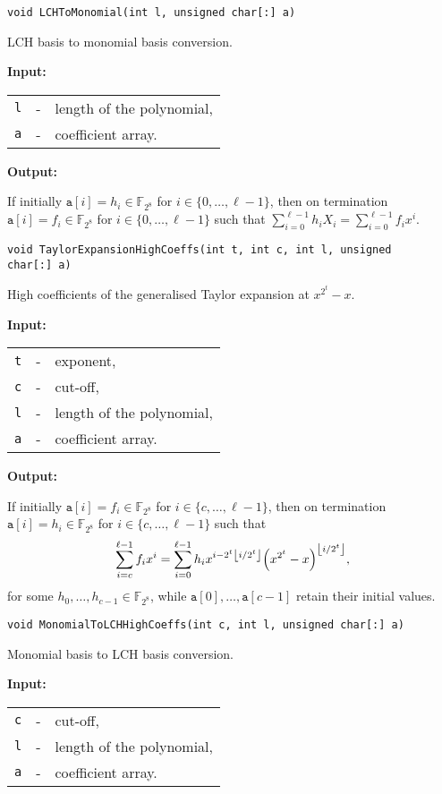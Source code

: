 \documentclass{amsart}
\makeatletter
\newcommand{\floor}[1]{\left\lfloor #1\right\rfloor}
\newcommand{\F}{\mathbb{F}}
\newcommand{\Input}{\textbf{Input:}}
\newcommand{\Output}{\textbf{Output:}}
\newcommand{\XtoM}{LCHToMonomial}
\newcommand{\MtoX}{MonomialToLCH}
\let\originalleft\left
\let\originalright\right
\renewcommand{\left}{\mathopen{}\mathclose\bgroup\originalleft}
\renewcommand{\right}{\aftergroup\egroup\originalright}
\newenvironment{inputs}{\Input\par\begin{tabular}{@{}rcl}}{\end{tabular}}
\newenvironment{outputs}{\Output\par}{}
\makeatother
\begin{document}
\texttt{void \XtoM(int l, unsigned char[:]\ a)}

LCH basis to monomial basis conversion.

\begin{inputs}
	\texttt{l} & - & length of the polynomial, \\
	\texttt{a} & - & coefficient array.
\end{inputs}

\begin{outputs}
	If initially $\texttt{a}[i]=h_i\in\F_{2^8}$ for $i\in\{0,\dotsc,\ell-1\}$, then
	on termination $\texttt{a}[i]=f_i\in\F_{2^8}$ for $i\in\{0,\dotsc,\ell-1\}$ such
	that $\sum^{\ell-1}_{i=0}h_iX_i=\sum^{\ell-1}_{i=0}f_ix^i$.
\end{outputs}

\texttt{void TaylorExpansionHighCoeffs(int t, int c, int l, unsigned char[:]\
	a)}

High coefficients of the generalised Taylor expansion at $x^{2^t}-x$.

\begin{inputs}
	\texttt{t} & - & exponent,                 \\
	\texttt{c} & - & cut-off,                  \\
	\texttt{l} & - & length of the polynomial, \\
	\texttt{a} & - & coefficient array.
\end{inputs}

\begin{outputs}
	If initially $\texttt{a}[i]=f_i\in\F_{2^8}$ for ${i\in\{c,\dotsc,\ell-1\}}$,
	then on termination $\texttt{a}[i]=h_i\in\F_{2^8}$ for $i\in\{c,\dotsc,\ell-1\}$
	such that
	\begin{equation}\label{eqn:taylor}
		\sum^{\ell-1}_{i=c}f_ix^i
		=
		\sum^{\ell-1}_{i=0}
		h_i
		x^{i-2^t\floor{i/2^t}}
		\left(x^{2^t}-x\right)^{\floor{i/2^t}},
	\end{equation}
	for some $h_0,\dots,h_{c-1}\in\F_{2^8}$, while
	$\texttt{a}[0],\dotsc,\texttt{a}[c-1]$ retain their initial values.
\end{outputs}

\texttt{void \MtoX HighCoeffs(int c, int l, unsigned char[:]\ a)}

Monomial basis to LCH basis conversion.

\begin{inputs}
	\texttt{c} & - & cut-off,                  \\
	\texttt{l} & - & length of the polynomial, \\
	\texttt{a} & - & coefficient array.
\end{inputs}
\end{document}
